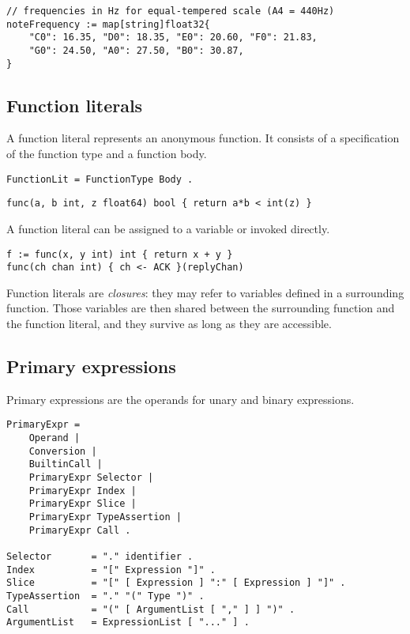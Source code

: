 {\begin{Verbatim}[frame=single]
// frequencies in Hz for equal-tempered scale (A4 = 440Hz)
noteFrequency := map[string]float32{
    "C0": 16.35, "D0": 18.35, "E0": 20.60, "F0": 21.83,
    "G0": 24.50, "A0": 27.50, "B0": 30.87,
}
\end{Verbatim}

\subsection*{Function literals}

A function literal represents an anonymous function. It consists of a
specification of the function type and a function body.

\begin{Verbatim}[frame=single]
FunctionLit = FunctionType Body .
\end{Verbatim}

\begin{Verbatim}[frame=single]
func(a, b int, z float64) bool { return a*b < int(z) }
\end{Verbatim}

A function literal can be assigned to a variable or invoked directly.

\begin{Verbatim}[frame=single]
f := func(x, y int) int { return x + y }
func(ch chan int) { ch <- ACK }(replyChan)
\end{Verbatim}

Function literals are \emph{closures}: they may refer to variables
defined in a surrounding function. Those variables are then shared
between the surrounding function and the function literal, and they
survive as long as they are accessible.

\subsection*{Primary expressions}

Primary expressions are the operands for unary and binary expressions.

\begin{Verbatim}[frame=single]
PrimaryExpr =
    Operand |
    Conversion |
    BuiltinCall |
    PrimaryExpr Selector |
    PrimaryExpr Index |
    PrimaryExpr Slice |
    PrimaryExpr TypeAssertion |
    PrimaryExpr Call .

Selector       = "." identifier .
Index          = "[" Expression "]" .
Slice          = "[" [ Expression ] ":" [ Expression ] "]" .
TypeAssertion  = "." "(" Type ")" .
Call           = "(" [ ArgumentList [ "," ] ] ")" .
ArgumentList   = ExpressionList [ "..." ] .
\end{Verbatim}

}
